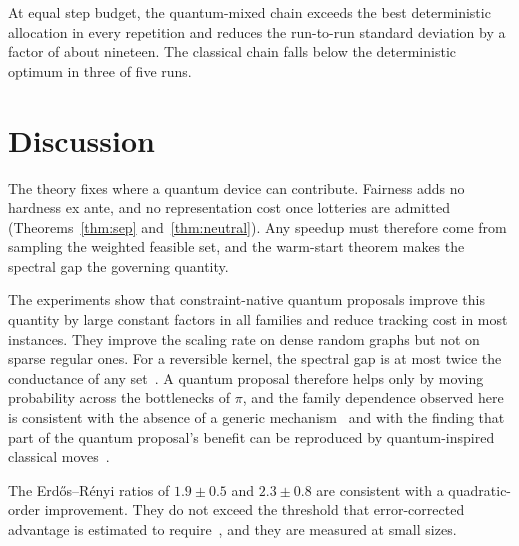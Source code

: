 \documentclass[11pt,a4paper]{article}
\begin{document}
At equal step budget, the quantum-mixed chain exceeds the best deterministic allocation in every
repetition and reduces the run-to-run standard deviation by a factor of about nineteen. The
classical chain falls below the deterministic optimum in three of five runs.

\section{Discussion}

The theory fixes where a quantum device can contribute. Fairness adds no hardness ex ante, and no
representation cost once lotteries are admitted (Theorems~\ref{thm:sep} and~\ref{thm:neutral}). Any
speedup must therefore come from sampling the weighted feasible set, and the warm-start theorem
makes the spectral gap the governing quantity.

The experiments show that constraint-native quantum proposals improve this quantity by large
constant factors in all families and reduce tracking cost in most instances. They improve the
scaling rate on dense random graphs but not on sparse regular ones. For a reversible kernel, the
spectral gap is at most twice the conductance of any set~\cite{levin2017markov,sinclair1989approximate}.
A quantum proposal therefore helps only by moving probability across the bottlenecks of $\pi$, and
the family dependence observed here is consistent with the absence of a generic
mechanism~\cite{orfi2024bounding,orfi2024barriers} and with the finding that part of the
quantum proposal's benefit can be reproduced by quantum-inspired classical
moves~\cite{christmann2025quantum}.

The Erd\H{o}s--R\'enyi ratios of $1.9\pm0.5$ and $2.3\pm0.8$ are consistent with a quadratic-order
improvement. They do not exceed the threshold that error-corrected advantage is estimated to
require~\cite{babbush2021focus}, and they are measured at small sizes.
\end{document}
